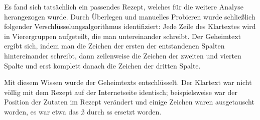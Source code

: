Es fand sich tatsächlich ein passendes Rezept, welches für die weitere Analyse
herangezogen wurde. Durch Überlegen und manuelles Probieren wurde schließlich
folgender Verschlüsselungsalgorithmus identifiziert: Jede Zeile des Klartextes
wird in Vierergruppen aufgeteilt, die man untereinander schreibt. Der Geheimtext
ergibt sich, indem man die Zeichen der ersten der entstandenen Spalten
hintereinander schreibt, dann zeilenweise die Zeichen der zweiten und vierten
Spalte und erst komplett danach die Zeichen der dritten Spalte.

Mit diesem Wissen wurde der Geheimtexts entschlüsselt. Der Klartext war nicht
völlig mit dem Rezept auf der Internetseite identisch; beispielsweise war der
Position der Zutaten im Rezept verändert und einige Zeichen waren ausgetauscht
worden, es war etwa das \glqq{}ß\grqq{} durch \glqq{}ss\grqq{} ersetzt worden.
